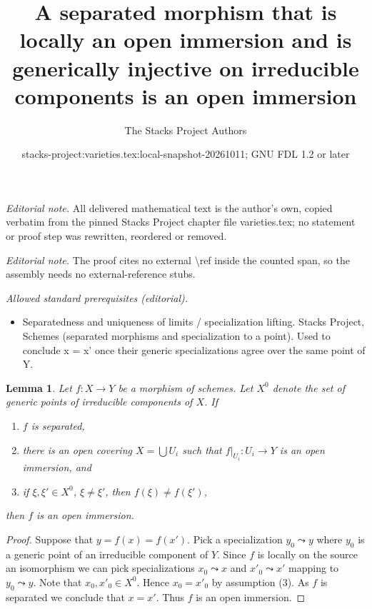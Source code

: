 \documentclass[10pt,a4paper]{amsart}
\title{A separated morphism that is locally an open immersion and is generically injective on irreducible components is an open immersion}
\author{The Stacks Project Authors}
\date{stacks-project:varieties.tex:local-snapshot-20261011; GNU FDL 1.2 or later}
\theoremstyle{plain}
\newtheorem{lemma}[subsection]{Lemma}
\theoremstyle{definition}
\theoremstyle{remark}
\numberwithin{equation}{subsection}
\begin{document}
\maketitle
\noindent\textit{Editorial note.} All delivered mathematical text is the author's own, copied verbatim from the pinned Stacks Project chapter file varieties.tex; no statement or proof step was rewritten, reordered or removed.\par\medskip
\noindent\textit{Editorial note.} The proof cites no external \textbackslash{}ref inside the counted span, so the assembly needs no external-reference stubs.\par\medskip
\noindent\textit{Allowed standard prerequisites (editorial).}\begin{itemize}
\item Separatedness and uniqueness of limits / specialization lifting. Stacks Project, Schemes (separated morphisms and specialization to a point). Used to conclude x = x' once their generic specializations agree over the same point of Y.
\end{itemize}\medskip
\begin{lemma}
\label{lemma-characterize-open-immersion}
Let $f : X \to Y$ be a morphism of schemes. Let $X^0$ denote the set
of generic points of irreducible components of $X$. If
\begin{enumerate}
\item $f$ is separated,
\item there is an open covering $X = \bigcup U_i$ such that
$f|_{U_i} : U_i \to Y$ is an open immersion, and
\item if $\xi, \xi' \in X^0$, $\xi \not = \xi'$, then $f(\xi) \not = f(\xi')$,
\end{enumerate}
then $f$ is an open immersion.
\end{lemma}

\begin{proof}
Suppose that $y = f(x) = f(x')$. Pick a specialization $y_0 \leadsto y$
where $y_0$ is a generic point of an irreducible component of $Y$.
Since $f$ is locally on the source an isomorphism we can pick specializations
$x_0 \leadsto x$ and $x'_0 \leadsto x'$ mapping to $y_0 \leadsto y$.
Note that $x_0, x'_0 \in X^0$. Hence $x_0 = x'_0$ by assumption (3).
As $f$ is separated we conclude that $x = x'$. Thus $f$ is an open immersion.
\end{proof}
\end{document}
